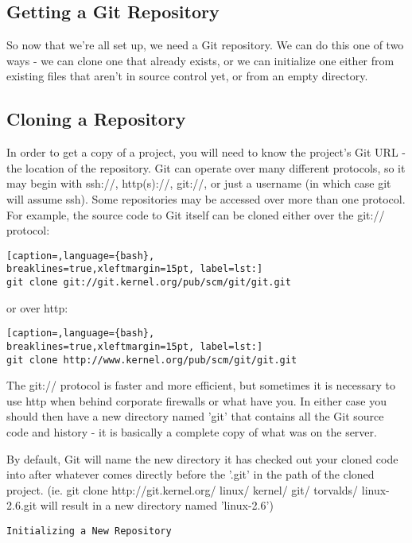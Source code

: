 \subsection{Getting a Git Repository}
So now that we're all set up, we need a Git repository. We can do this one of
two ways - we can clone one that already exists, or we can initialize one
either from existing files that aren't in source control yet, or from an empty
directory.

\subsection{Cloning a Repository}
In order to get a copy of a project, you will need to know the project's Git
URL - the location of the repository. Git can operate over many different
protocols, so it may begin with ssh://, http(s)://, git://, or just a username
(in which case git will assume ssh). Some repositories may be accessed over
more than one protocol. For example, the source code to Git itself can be
cloned either over the git:// protocol:
\lstset{basicstyle=\scriptsize, numbers=none, captionpos=b, tabsize=4}
\begin{lstlisting}[caption=,language={bash},
breaklines=true,xleftmargin=15pt, label=lst:]
git clone git://git.kernel.org/pub/scm/git/git.git
\end{lstlisting}

or over http:
\lstset{basicstyle=\scriptsize, numbers=none, captionpos=b, tabsize=4}
\begin{lstlisting}[caption=,language={bash},
breaklines=true,xleftmargin=15pt, label=lst:]
git clone http://www.kernel.org/pub/scm/git/git.git
\end{lstlisting}

The git:// protocol is faster and more efficient, but sometimes it is necessary
to use http when behind corporate firewalls or what have you. In either case
you should then have a new directory named 'git' that contains all the Git
source code and history - it is basically a complete copy of what was on the
server.

By default, Git will name the new directory it has checked out your cloned code
into after whatever comes directly before the '.git' in the path of the cloned
project. (ie. git clone http://git.kernel.org/ linux/ kernel/ git/ torvalds/
linux-2.6.git will result in a new directory named 'linux-2.6')
\scriptsize
\begin{verbatim}
Initializing a New Repository
\end{verbatim}
\normalsize

